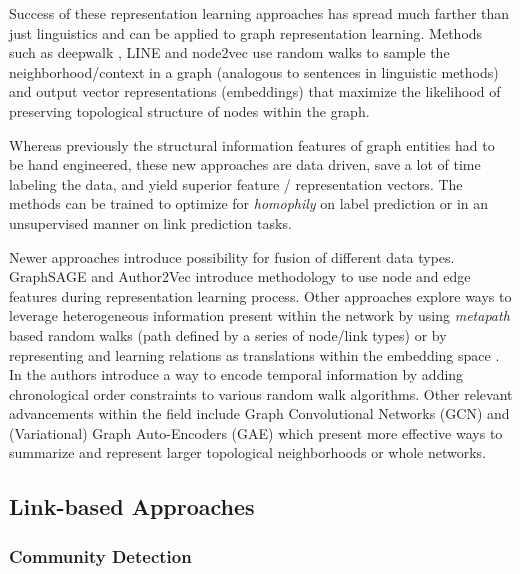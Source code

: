 \documentclass[
acmsmall,
nonacm,
screen,
acmthm]{../../scripts/pandoc/templates/acmart}
\begin{document}
Success of these representation learning approaches has spread much
farther than just linguistics and can be applied to graph representation
learning. Methods such as deepwalk
\citep{perozziDeepWalkOnlineLearning2014}, LINE
\citep{tangLINELargescaleInformation2015} and node2vec
\citep{groverNode2vecScalableFeature2016} use random walks to sample the
neighborhood/context in a graph (analogous to sentences in linguistic
methods) and output vector representations (embeddings) that maximize
the likelihood of preserving topological structure of nodes within the
graph.

Whereas previously the structural information features of graph entities
had to be hand engineered, these new approaches are data driven, save a
lot of time labeling the data, and yield superior feature /
representation vectors. The methods can be trained to optimize for
\emph{homophily} on label prediction or in an unsupervised manner on
link prediction tasks.

Newer approaches introduce possibility for fusion of different data
types. GraphSAGE \citep{hamiltonInductiveRepresentationLearning2018} and
Author2Vec \citep{wuAuthor2VecFrameworkGenerating2020} introduce
methodology to use node and edge features during representation learning
process. Other approaches explore ways to leverage heterogeneous
information present within the network by using \emph{metapath} based
random walks (path defined by a series of node/link types)
\citep{dongMetapath2vecScalableRepresentation2017} or by representing
and learning relations as translations within the embedding space
\citep{bordesTranslatingEmbeddingsModeling2013}. In
\citet{nguyenContinuousTimeDynamicNetwork2018} the authors introduce a
way to encode temporal information by adding chronological order
constraints to various random walk algorithms. Other relevant
advancements within the field include Graph Convolutional Networks (GCN)
\citep{kipfSemiSupervisedClassificationGraph2017a} and (Variational)
Graph Auto-Encoders (GAE) \citep{kipfVariationalGraphAutoEncoders2016}
which present more effective ways to summarize and represent larger
topological neighborhoods or whole networks.

\hypertarget{link-based-approaches}{%
\subsection{Link-based Approaches}\label{link-based-approaches}}

\hypertarget{community-detection-1}{%
\subsubsection{Community Detection}\label{community-detection-1}}
\end{document}
